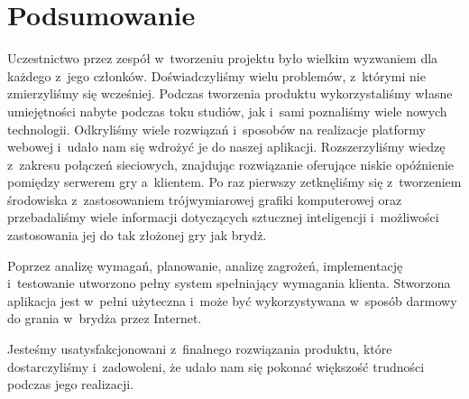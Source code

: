 \section{Podsumowanie}

Uczestnictwo przez zespół w~tworzeniu projektu
było wielkim wyzwaniem dla każdego z~jego członków.
Doświadczyliśmy wielu problemów, z~którymi nie
zmierzyliśmy się wcześniej. Podczas tworzenia
produktu wykorzystaliśmy własne umiejętności nabyte podczas
toku studiów, jak i~sami poznaliśmy wiele nowych technologii.
Odkryliśmy wiele rozwiązań i~sposobów na realizacje
platformy webowej i~udało nam się wdrożyć je do naszej aplikacji.
Rozszerzyliśmy wiedzę z~zakresu połączeń sieciowych, znajdując
rozwiązanie oferujące niskie opóźnienie pomiędzy serwerem gry
a~klientem. Po raz pierwszy zetknęliśmy się z~tworzeniem
środowiska z~zastosowaniem trójwymiarowej grafiki komputerowej
oraz przebadaliśmy wiele informacji dotyczących sztucznej
inteligencji i~możliwości zastosowania jej do tak złożonej gry
jak brydż.

Poprzez analizę
wymagań, planowanie, analizę zagrożeń, implementację
i~testowanie utworzono pełny system spełniający wymagania
klienta.
Stworzona aplikacja jest w~pełni użyteczna i~może być
wykorzystywana w~sposób darmowy do grania w~brydża przez Internet.

Jesteśmy usatysfakcjonowani z~finalnego rozwiązania produktu,
które dostarczyliśmy i~zadowoleni, że udało nam się pokonać
większość trudności podczas jego realizacji.



